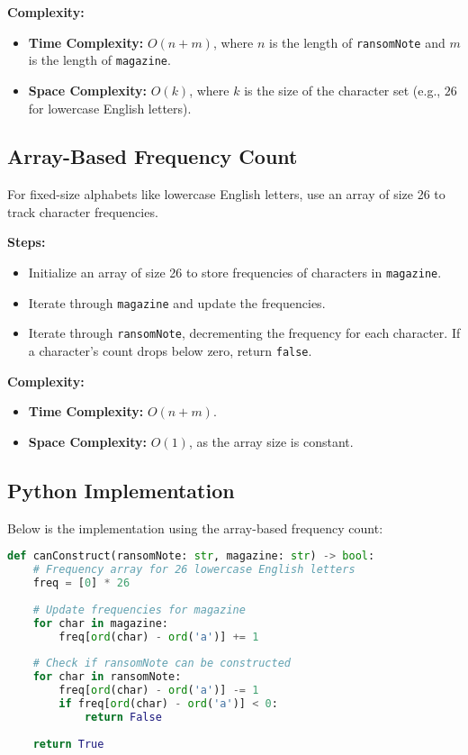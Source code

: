 \textbf{Complexity:}
\begin{itemize}
    \item \textbf{Time Complexity:} \(O(n + m)\), where \(n\) is the length of \texttt{ransomNote} and \(m\) is the length of \texttt{magazine}.
    \item \textbf{Space Complexity:} \(O(k)\), where \(k\) is the size of the character set (e.g., \(26\) for lowercase English letters).
\end{itemize}

\subsection*{Array-Based Frequency Count}
For fixed-size alphabets like lowercase English letters, use an array of size 26 to track character frequencies.

\textbf{Steps:}
\begin{itemize}
    \item Initialize an array of size 26 to store frequencies of characters in \texttt{magazine}.
    \item Iterate through \texttt{magazine} and update the frequencies.
    \item Iterate through \texttt{ransomNote}, decrementing the frequency for each character. If a character's count drops below zero, return \texttt{false}.
\end{itemize}

\textbf{Complexity:}
\begin{itemize}
    \item \textbf{Time Complexity:} \(O(n + m)\).
    \item \textbf{Space Complexity:} \(O(1)\), as the array size is constant.
\end{itemize}

\subsection*{Python Implementation}
Below is the implementation using the array-based frequency count:

\begin{fullwidth}
\begin{lstlisting}[language=Python]
def canConstruct(ransomNote: str, magazine: str) -> bool:
    # Frequency array for 26 lowercase English letters
    freq = [0] * 26
    
    # Update frequencies for magazine
    for char in magazine:
        freq[ord(char) - ord('a')] += 1
    
    # Check if ransomNote can be constructed
    for char in ransomNote:
        freq[ord(char) - ord('a')] -= 1
        if freq[ord(char) - ord('a')] < 0:
            return False
    
    return True
\end{lstlisting}
\end{fullwidth}

